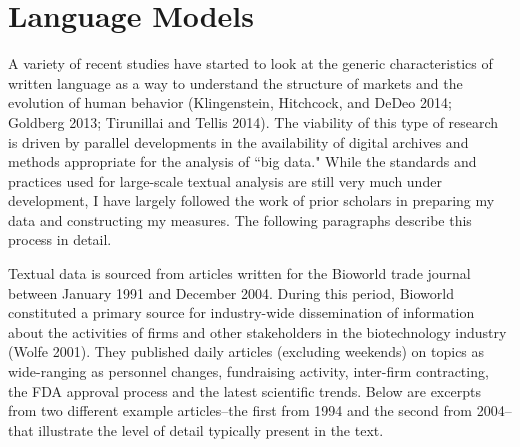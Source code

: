 \section{Language Models}

A variety of recent studies have started to look at the generic characteristics of written language as a way to understand the structure of markets and the evolution of human behavior (Klingenstein, Hitchcock, and DeDeo 2014; Goldberg 2013; Tirunillai and Tellis 2014). The viability of this type of research is driven by parallel developments in the availability of digital archives and methods appropriate for the analysis of ``big data." While the standards and practices used for large-scale textual analysis are still very much under development, I have largely followed the work of prior scholars in preparing my data and constructing my measures. The following paragraphs describe this process in detail.

Textual data is sourced from articles written for the Bioworld trade journal between January 1991 and December 2004. During this period, Bioworld constituted a primary source for industry-wide dissemination of information about the activities of firms and other stakeholders in the biotechnology industry (Wolfe 2001). They published daily articles (excluding weekends) on topics as wide-ranging as personnel changes, fundraising activity, inter-firm contracting, the FDA approval process and the latest scientific trends. Below are excerpts from two different example articles--the first from 1994 and the second from 2004--that illustrate the level of detail typically present in the text.

